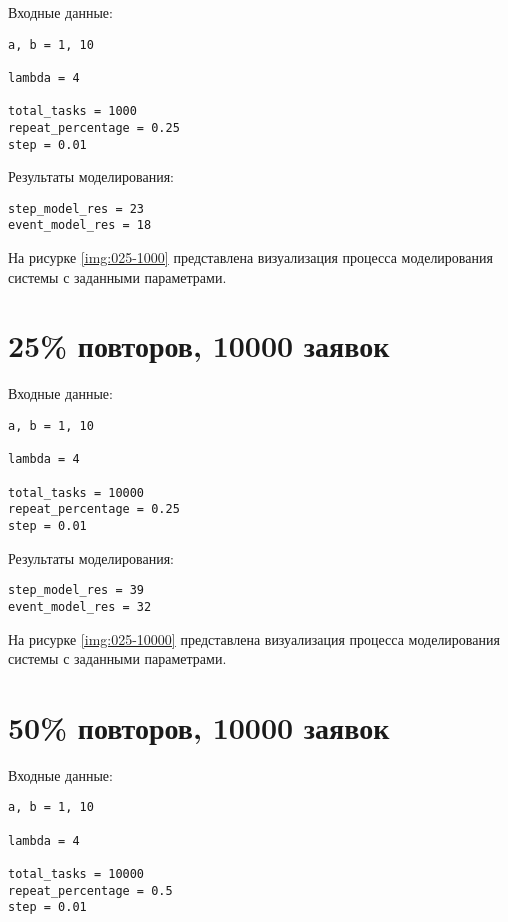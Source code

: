 Входные данные:

\begin{verbatim}
a, b = 1, 10

lambda = 4

total_tasks = 1000
repeat_percentage = 0.25
step = 0.01
\end{verbatim}

Результаты моделирования:

\begin{verbatim}
step_model_res = 23
event_model_res = 18
\end{verbatim}

На рисурке \ref{img:025-1000} представлена визуализация процесса моделирования системы с заданными параметрами.


\section{25\% повторов, 10000 заявок}

Входные данные:

\begin{verbatim}
a, b = 1, 10

lambda = 4

total_tasks = 10000
repeat_percentage = 0.25
step = 0.01
\end{verbatim}

Результаты моделирования:

\begin{verbatim}
step_model_res = 39
event_model_res = 32
\end{verbatim}

На рисурке \ref{img:025-10000} представлена визуализация процесса моделирования системы с заданными параметрами.


\section{50\% повторов, 10000 заявок}

Входные данные:

\begin{verbatim}
a, b = 1, 10

lambda = 4

total_tasks = 10000
repeat_percentage = 0.5
step = 0.01
\end{verbatim}

